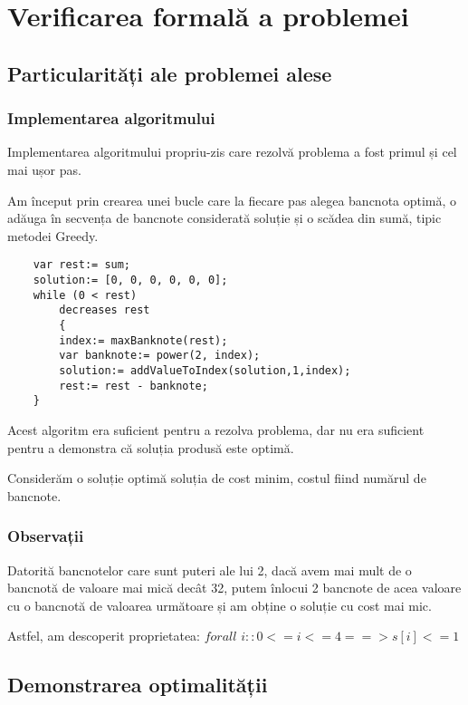 
\chapter{Verificarea formală a problemei}


\section{Particularități ale problemei alese}
    \subsection{Implementarea algoritmului}
    Implementarea algoritmului propriu-zis care rezolvă problema a fost primul și cel mai ușor pas.\par
    Am început prin crearea unei bucle care la fiecare pas alegea bancnota optimă, o adăuga în secvența de 
    bancnote considerată soluție și o scădea din sumă, tipic metodei Greedy.
    \begin{lstlisting}
    var rest:= sum;
    solution:= [0, 0, 0, 0, 0, 0];
    while (0 < rest)
        decreases rest 
        {
        index:= maxBanknote(rest);
        var banknote:= power(2, index);
        solution:= addValueToIndex(solution,1,index);
        rest:= rest - banknote;
    }
    \end{lstlisting}

    Acest algoritm era suficient pentru a rezolva problema, dar nu era suficient pentru a demonstra că soluția produsă este optimă.\par
    Considerăm o soluție optimă soluția de cost minim, costul fiind numărul de bancnote.
    \subsection{Observații}
    Datorită bancnotelor care sunt puteri ale lui 2, dacă avem mai mult de o bancnotă de valoare mai mică decât 32,
    putem înlocui 2 bancnote de acea valoare cu o bancnotă de valoarea următoare și am obține o soluție cu cost mai mic.\par
    Astfel, am descoperit proprietatea: 
    $  forall$ $i :: 0 <= i <= 4 ==> s[i] <= 1 $

\section{Demonstrarea optimalității}
